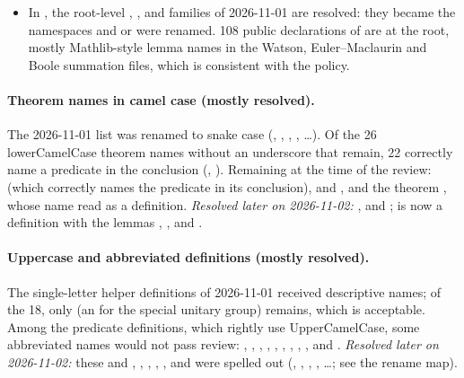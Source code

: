 \documentclass[11pt,a4paper]{article}
\begin{document}
\begin{itemize}
     (24),  (19) and  (14).
    \emph{Resolved later on 2026-11-02:} they are now ,
    ,  and .
  \item In , the root-level , ,
     and  families of 2026-11-01 are resolved: they became the
    namespaces  and  or were renamed.
    108 public declarations of  are at the root, mostly Mathlib-style
    lemma names in the Watson, Euler--Maclaurin and Boole summation files, which is
    consistent with the policy.
\end{itemize}

\paragraph{Theorem names in camel case (mostly resolved).}
The 2026-11-01 list was renamed to snake case (, ,
, , \ldots). Of the 26
lowerCamelCase theorem names without an underscore that remain, 22 correctly name a predicate
in the conclusion (, ).
Remaining at the time of the review:  (which correctly
names the predicate  in its conclusion),  and
, and the theorem , whose name read as a
definition. \emph{Resolved later on 2026-11-02:} ,
 and ;  is
now a definition with the lemmas , ,
 and .

\paragraph{Uppercase and abbreviated definitions (mostly resolved).}
The single-letter helper definitions of 2026-11-01 received descriptive names; of the 18,
only  (an  for the special unitary group) remains,
which is acceptable. Among the predicate definitions, which rightly use UpperCamelCase, some
abbreviated names would not pass review: , , ,
, , , ,
, ,  and . \emph{Resolved later on
2026-11-02:} these and , , ,
, ,  and 
were spelled out (, ,
, , \ldots; see the rename map).
\end{document}
